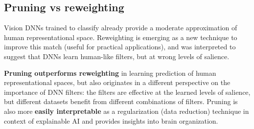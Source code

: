 \subsection{Pruning vs reweighting}
Vision DNNs trained to classify already provide a moderate approximation of human representational space.
Reweighting is emerging as a new technique to improve this match (useful for practical applications), and was interpreted to suggest that DNNs learn human-like filters, but at wrong levels of salience.

\textbf{Pruning outperforms reweighting} in learning prediction of human representational spaces, but also originates in a different perspective on the importance of DNN filters: the filters are effective at the learned levels of salience, but different datasets benefit from different combinations of filters. Pruning is also more \textbf{easily interpretable} as a regularization (data reduction) technique in context of explainable AI and provides insights into brain organization.

